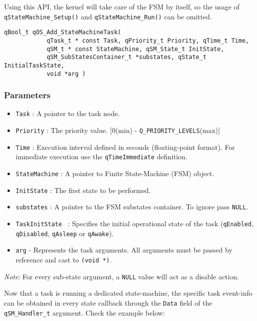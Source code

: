 Using this API, the kernel will take care of the FSM by itself, so the usage of \lstinline{qStateMachine_Setup()} and \lstinline{qStateMachine_Run()} can be omitted. 
\medskip

\begin{lstlisting}[style=CStyle]
qBool_t qOS_Add_StateMachineTask( 
            qTask_t * const Task, qPriority_t Priority, qTime_t Time,
            qSM_t * const StateMachine, qSM_State_t InitState, 
            qSM_SubStatesContainer_t *substates, qState_t InitialTaskState,
            void *arg )
\end{lstlisting}

\subsubsection*{Parameters}
\begin{itemize}
    \item \lstinline{Task} : A pointer to the task node. 
    \item \lstinline{Priority} : The priority value. [0(min) - \lstinline{Q_PRIORITY_LEVELS}(max)]
    \item \lstinline{Time} : Execution interval defined in seconds (floating-point format). For immediate execution use the  \lstinline{qTimeImmediate} definition. 
    \item \lstinline{StateMachine} : A pointer to Finite State-Machine (FSM) object.
    \item \lstinline{InitState} : The first state to be performed. 
    \item \lstinline{substates} : A pointer to the FSM substates container. To ignore pass \lstinline{NULL}.   
    \item \lstinline{TaskInitState } : Specifies the initial operational state of the task (\lstinline{qEnabled}, \lstinline{qDisabled}, \lstinline{qAsleep} or \lstinline{qAwake}).
    \item \lstinline{arg} - Represents the task arguments. All arguments must be passed by reference and cast to \lstinline{(void *)}. 
\end{itemize}

\begin{tcolorbox}
\ArrowBoldDownRight \textit{Note}: For every sub-state argument, a \lstinline{NULL} value will act as a disable action.
\end{tcolorbox}

Now that a task is running a dedicated state-machine, the specific task event-info can be obtained in every state callback through the \lstinline{Data} field of the \lstinline{qSM_Handler_t} argument. Check the example below:
\medskip

